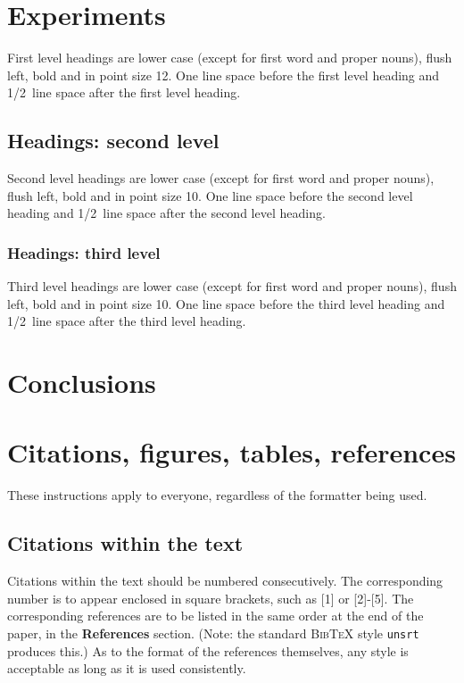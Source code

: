 \documentclass{article} %
\begin{document}
\section{Experiments}
\label{headings}

First level headings are lower case (except for first word and proper nouns),
flush left, bold and in point size 12. One line space before the first level
heading and 1/2~line space after the first level heading.

\subsection{Headings: second level}

Second level headings are lower case (except for first word and proper nouns),
flush left, bold and in point size 10. One line space before the second level
heading and 1/2~line space after the second level heading.

\subsubsection{Headings: third level}

Third level headings are lower case (except for first word and proper nouns),
flush left, bold and in point size 10. One line space before the third level
heading and 1/2~line space after the third level heading.

\section{Conclusions}


\section{Citations, figures, tables, references}
\label{others}

These instructions apply to everyone, regardless of the formatter being used.

\subsection{Citations within the text}

Citations within the text should be numbered consecutively. The corresponding
number is to appear enclosed in square brackets, such as [1] or [2]-[5]. The
corresponding references are to be listed in the same order at the end of the
paper, in the \textbf{References} section. (Note: the standard
\textsc{Bib\TeX} style \texttt{unsrt} produces this.) As to the format of the
references themselves, any style is acceptable as long as it is used
consistently.
\end{document}
